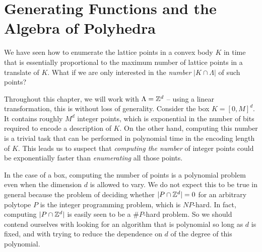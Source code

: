 %
%
%

\chapter{Generating Functions and the Algebra of Polyhedra}

We have seen how to enumerate the lattice points in a convex body $K$
in time that is essentially proportional to the maximum number of lattice points
in a translate of $K$.
What if we are only interested in the \emph{number} $|K \cap \Lambda|$ of such points?

Throughout this chapter, we will work with $\Lambda = \mathbb{Z}^d$ -- using a linear transformation,
this is without loss of generality.
Consider the box $K = [0,M]^d$.
It contains roughly $M^d$ integer points, which is exponential in the number of bits
required to encode a description of $K$.
On the other hand, computing this number is a trivial task that can be performed in
polynomial time in the encoding length of $K$.
This leads us to suspect that \emph{computing the number} of integer points could be
exponentially faster than \emph{enumerating} all those points.

In the case of a box,
computing the number of points is a polynomial problem even when the dimension $d$ is allowed to vary.
We do not expect this to be true in general
because the problem of deciding whether $|P \cap \mathbb{Z}^d| = 0$ for an arbitrary polytope $P$ is the integer programming problem,
which is $NP$-hard.
In fact, computing $|P \cap \mathbb{Z}^d|$ is easily seen to be a $\# P$-hard problem.
So we should contend ourselves with looking for an algorithm that is polynomial so long as $d$ is fixed,
and with trying to reduce the dependence on $d$ of the degree of this polynomial.


